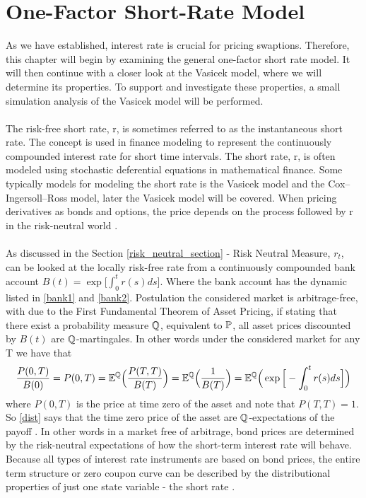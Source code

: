 \section{One-Factor Short-Rate Model}
As we have established, interest rate is crucial 
for pricing swaptions. Therefore, this chapter will 
begin by examining the general one-factor short rate 
model. It will then continue with a closer look at the 
Vasicek model, where we will determine its properties. 
To support and investigate these properties, a small 
simulation analysis of the Vasicek model will be 
performed.
\\\\
The risk-free short rate, r, is sometimes referred to as the instantaneous short rate. 
The concept is used in finance modeling to represent the continuously compounded interest rate for 
short time intervals. The short rate, r, is often modeled using stochastic deferential equations in 
mathematical finance. Some typically models for modeling the short rate is the Vasicek model and the Cox–Ingersoll–Ross model, 
later the Vasicek model will be covered. When pricing derivatives as bonds and options, the price depends on 
the process followed by r in the risk-neutral world \cite{Hull}.
\\\\
As discussed in the Section \ref{risk_neutral_section} - Risk Neutral Measure, $r_t$, can be looked at the locally risk-free 
rate from a continuously compounded bank account $B(t)= \exp \Big[\int_{0}^{t} r(s) ds \Big]$. 
Where the bank account has the dynamic listed in \autoref{bank1} and \autoref{bank2}.
Postulation the considered market is arbitrage-free, with due to the First Fundamental Theorem of Asset Pricing, 
if stating that there exist a probability measure $\mathbb{Q}$, equivalent to $\mathbb{P}$, all asset prices discounted by $B(t)$
are $\mathbb{Q}$-martingales. In other words under the considered market for any T we have that 
\begin{align}
    \frac{P(0,T)}{B(0)} = P(0,T) = \mathbb{E}^{\mathbb{Q}} \Big( \frac{P(T,T)}{B(T)}\Big) = \mathbb{E}^{\mathbb{Q}} \Big( \frac{1}{B(T)}\Big) 
    = \mathbb{E}^{\mathbb{Q}} \Big( \exp \Big[ - \int_{0}^{t}r(s)ds \Big] \Big)
    \label{dist}
\end{align}
where $P(0,T)$ is the price at time zero of the asset and note that $P(T,T)=1$. So \autoref{dist} says that 
the time zero price of the asset are $\mathbb{Q}$-expectations  of the payoff \cite{Bermudan}.
In other words in a market free of arbitrage, bond prices are determined by the risk-neutral expectations 
of how the short-term interest rate will behave. Because all types of interest rate instruments are based
on bond prices, the entire term structure or zero coupon curve can be described by the distributional properties
of just one state variable - the short rate \cite{Bermudan}.

